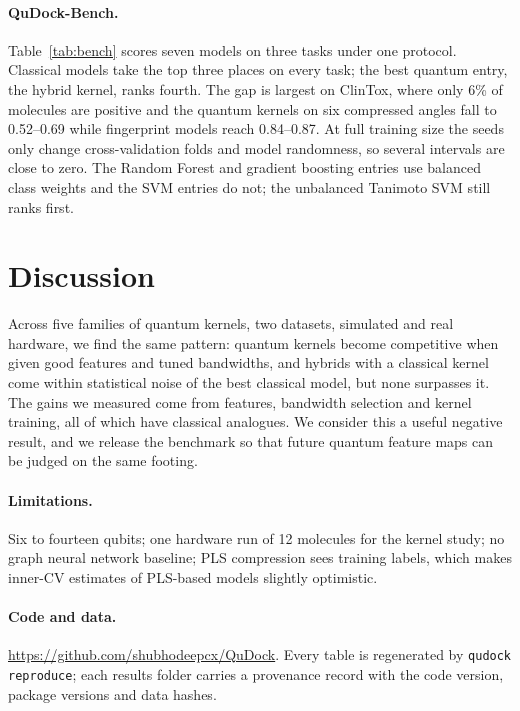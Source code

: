 \documentclass[11pt]{article}
\begin{document}
\paragraph{QuDock-Bench.} Table~\ref{tab:bench} scores seven models on three tasks under one
protocol. Classical models take the top three places on every task; the best quantum entry,
the hybrid kernel, ranks fourth. The gap is largest on ClinTox, where only 6\% of molecules are
positive and the quantum kernels on six compressed angles fall to 0.52--0.69 while fingerprint
models reach 0.84--0.87. At full training size the seeds only change cross-validation folds and
model randomness, so several intervals are close to zero. The Random Forest and gradient
boosting entries use balanced class weights and the SVM entries do not; the unbalanced Tanimoto
SVM still ranks first.



\section{Discussion}
Across five families of quantum kernels, two datasets, simulated and real hardware, we find the
same pattern: quantum kernels become competitive when given good features and tuned
bandwidths, and hybrids with a classical kernel come within statistical noise of the best
classical model, but none surpasses it. The gains we measured come from features, bandwidth
selection and kernel training, all of which have classical analogues. We consider this a useful
negative result, and we release the benchmark so that future quantum feature maps can be judged
on the same footing.

\paragraph{Limitations.} Six to fourteen qubits; one hardware run of 12 molecules for the kernel
study; no graph neural network baseline; PLS compression sees training labels, which makes
inner-CV estimates of PLS-based models slightly optimistic.

\paragraph{Code and data.} \url{https://github.com/shubhodeepcx/QuDock}.
Every table is regenerated by \texttt{qudock reproduce}; each results folder carries a
provenance record with the code version, package versions and data hashes.



\end{document}
